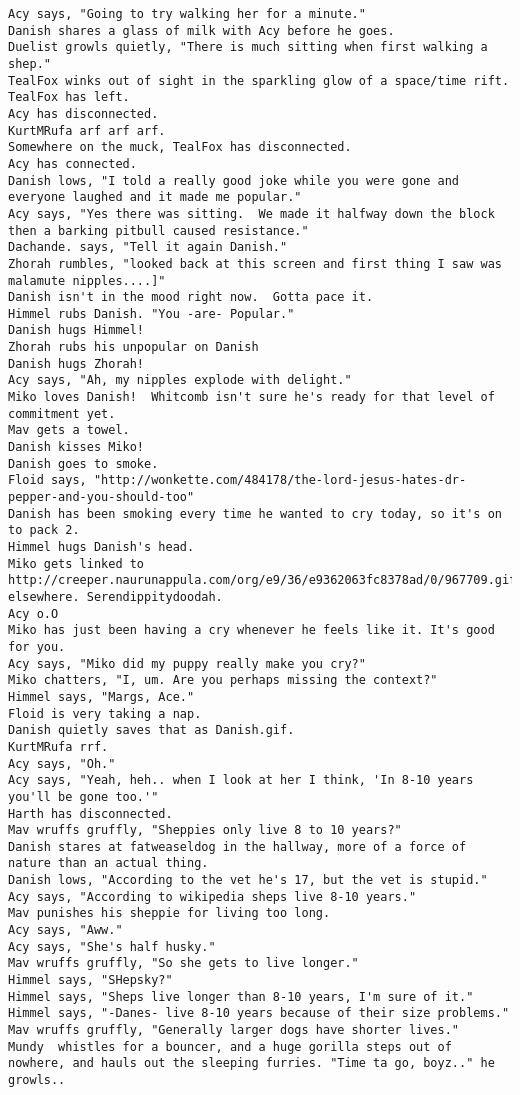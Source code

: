 \begin{verbatim}
Acy says, "Going to try walking her for a minute."
Danish shares a glass of milk with Acy before he goes.
Duelist growls quietly, "There is much sitting when first walking a shep."
TealFox winks out of sight in the sparkling glow of a space/time rift.
TealFox has left.
Acy has disconnected.
KurtMRufa arf arf arf.
Somewhere on the muck, TealFox has disconnected.
Acy has connected.
Danish lows, "I told a really good joke while you were gone and everyone laughed and it made me popular."
Acy says, "Yes there was sitting.  We made it halfway down the block then a barking pitbull caused resistance."
Dachande. says, "Tell it again Danish."
Zhorah rumbles, "looked back at this screen and first thing I saw was malamute nipples....]"
Danish isn't in the mood right now.  Gotta pace it.
Himmel rubs Danish. "You -are- Popular."
Danish hugs Himmel!
Zhorah rubs his unpopular on Danish
Danish hugs Zhorah!
Acy says, "Ah, my nipples explode with delight."
Miko loves Danish!  Whitcomb isn't sure he's ready for that level of commitment yet.
Mav gets a towel.
Danish kisses Miko!
Danish goes to smoke.
Floid says, "http://wonkette.com/484178/the-lord-jesus-hates-dr-pepper-and-you-should-too"
Danish has been smoking every time he wanted to cry today, so it's on to pack 2.
Himmel hugs Danish's head.
Miko gets linked to http://creeper.naurunappula.com/org/e9/36/e9362063fc8378ad/0/967709.gif elsewhere. Serendippitydoodah.
Acy o.O
Miko has just been having a cry whenever he feels like it. It's good for you.
Acy says, "Miko did my puppy really make you cry?"
Miko chatters, "I, um. Are you perhaps missing the context?"
Himmel says, "Margs, Ace."
Floid is very taking a nap.
Danish quietly saves that as Danish.gif.
KurtMRufa rrf.
Acy says, "Oh."
Acy says, "Yeah, heh.. when I look at her I think, 'In 8-10 years you'll be gone too.'"
Harth has disconnected.
Mav wruffs gruffly, "Sheppies only live 8 to 10 years?"
Danish stares at fatweaseldog in the hallway, more of a force of nature than an actual thing.
Danish lows, "According to the vet he's 17, but the vet is stupid."
Acy says, "According to wikipedia sheps live 8-10 years."
Mav punishes his sheppie for living too long.
Acy says, "Aww."
Acy says, "She's half husky."
Mav wruffs gruffly, "So she gets to live longer."
Himmel says, "SHepsky?"
Himmel says, "Sheps live longer than 8-10 years, I'm sure of it."
Himmel says, "-Danes- live 8-10 years because of their size problems."
Mav wruffs gruffly, "Generally larger dogs have shorter lives."
Mundy  whistles for a bouncer, and a huge gorilla steps out of nowhere, and hauls out the sleeping furries. "Time ta go, boyz.." he growls..

\end{verbatim}

